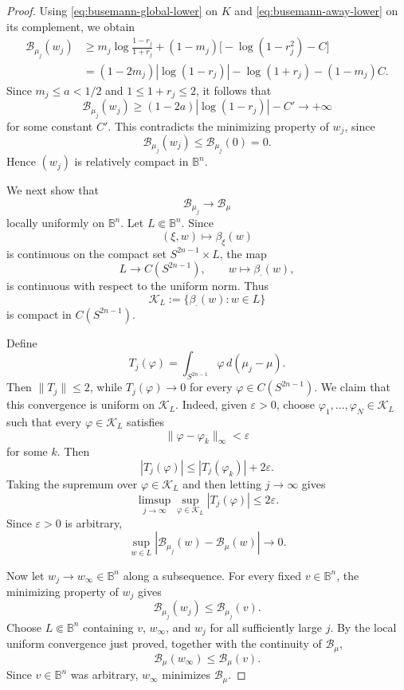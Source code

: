 \documentclass[10pt,a4paper]{amsart}
\newcommand{\B}{\mathbb B}
\theoremstyle{plain}
\theoremstyle{definition}
\theoremstyle{remark}
\theoremstyle{definition}
\begin{document}
\begin{proof}
Using \eqref{eq:busemann-global-lower} on \(K\) and
\eqref{eq:busemann-away-lower} on its complement, we obtain
\[
\begin{aligned}
        \mathcal B_{\mu_j}(w_j)
        &\ge
        m_j\log\frac{1-r_j}{1+r_j}
        +(1-m_j)\bigl[-\log(1-r_j^2)-C\bigr] \\
        &=
        (1-2m_j)|\log(1-r_j)|
        -\log(1+r_j)-(1-m_j)C.
\end{aligned}
\]
Since \(m_j\le a<1/2\) and \(1\le 1+r_j\le2\), it follows that
\[
        \mathcal B_{\mu_j}(w_j)
        \ge
        (1-2a)|\log(1-r_j)|-C'
        \longrightarrow+\infty
\]
for some constant \(C'\). This contradicts the minimizing property of
\(w_j\), since
\[
        \mathcal B_{\mu_j}(w_j)
        \le
        \mathcal B_{\mu_j}(0)
        =0.
\]
Hence \((w_j)\) is relatively compact in \(\B^n\).

We next show that
\[
        \mathcal B_{\mu_j}\longrightarrow\mathcal B_\mu
\]
locally uniformly on \(\B^n\). Let \(L\Subset\B^n\). Since
\[
        (\xi,w)\longmapsto\beta_\xi(w)
\]
is continuous on the compact set \(S^{2n-1}\times L\), the map
\[
        L\longrightarrow C(S^{2n-1}),
        \qquad
        w\longmapsto\beta_{\cdot}(w),
\]
is continuous with respect to the uniform norm. Thus
\[
        \mathcal K_L
        :=
        \{\beta_{\cdot}(w):w\in L\}
\]
is compact in \(C(S^{2n-1})\).

Define
\[
        T_j(\varphi)
        =
        \int_{S^{2n-1}}\varphi\,d(\mu_j-\mu).
\]
Then \(\|T_j\|\le2\), while \(T_j(\varphi)\to0\) for every
\(\varphi\in C(S^{2n-1})\). We claim that this convergence is uniform on
\(\mathcal K_L\). Indeed, given \(\varepsilon>0\), choose
\(\varphi_1,\ldots,\varphi_N\in\mathcal K_L\) such that every
\(\varphi\in\mathcal K_L\) satisfies
\[
        \|\varphi-\varphi_k\|_\infty<\varepsilon
\]
for some \(k\). Then
\[
        |T_j(\varphi)|
        \le
        |T_j(\varphi_k)|+2\varepsilon.
\]
Taking the supremum over \(\varphi\in\mathcal K_L\) and then letting
\(j\to\infty\) gives
\[
        \limsup_{j\to\infty}
        \sup_{\varphi\in\mathcal K_L}|T_j(\varphi)|
        \le2\varepsilon.
\]
Since \(\varepsilon>0\) is arbitrary,
\[
        \sup_{w\in L}
        |\mathcal B_{\mu_j}(w)-\mathcal B_\mu(w)|
        \longrightarrow0.
\]

Now let \(w_j\to w_\infty\in\B^n\) along a subsequence. For every fixed
\(v\in\B^n\), the minimizing property of \(w_j\) gives
\[
        \mathcal B_{\mu_j}(w_j)
        \le
        \mathcal B_{\mu_j}(v).
\]
Choose \(L\Subset\B^n\) containing \(v\), \(w_\infty\), and \(w_j\) for all
sufficiently large \(j\). By the local uniform convergence just proved,
together with the continuity of \(\mathcal B_\mu\),
\[
        \mathcal B_\mu(w_\infty)
        \le
        \mathcal B_\mu(v).
\]
Since \(v\in\B^n\) was arbitrary, \(w_\infty\) minimizes
\(\mathcal B_\mu\).


\end{proof}
\end{document}
